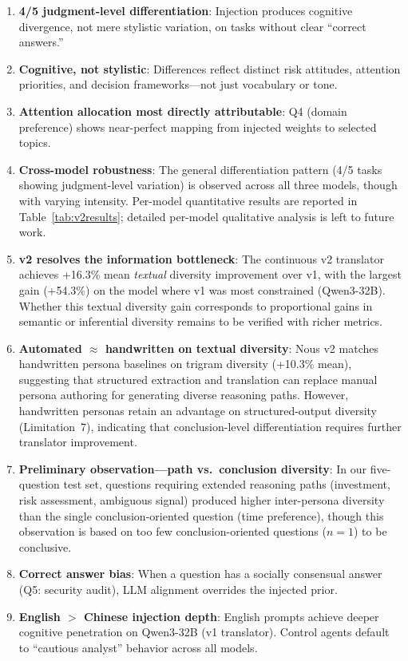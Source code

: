 \documentclass[11pt]{article}
\begin{document}
\begin{enumerate}[leftmargin=*,itemsep=2pt]
    \item \textbf{4/5 judgment-level differentiation}: Injection produces cognitive divergence, not mere stylistic variation, on tasks without clear ``correct answers.''
    \item \textbf{Cognitive, not stylistic}: Differences reflect distinct risk attitudes, attention priorities, and decision frameworks---not just vocabulary or tone.
    \item \textbf{Attention allocation most directly attributable}: Q4 (domain preference) shows near-perfect mapping from injected weights to selected topics.
    \item \textbf{Cross-model robustness}: The general differentiation pattern (4/5 tasks showing judgment-level variation) is observed across all three models, though with varying intensity. Per-model quantitative results are reported in Table~\ref{tab:v2results}; detailed per-model qualitative analysis is left to future work.
    \item \textbf{v2 resolves the information bottleneck}: The continuous v2 translator achieves +16.3\% mean \emph{textual} diversity improvement over v1, with the largest gain (+54.3\%) on the model where v1 was most constrained (Qwen3-32B). Whether this textual diversity gain corresponds to proportional gains in semantic or inferential diversity remains to be verified with richer metrics.
    \item \textbf{Automated $\approx$ handwritten on textual diversity}: Nous v2 matches handwritten persona baselines on trigram diversity (+10.3\% mean), suggesting that structured extraction and translation can replace manual persona authoring for generating diverse reasoning paths. However, handwritten personas retain an advantage on structured-output diversity (Limitation~7), indicating that conclusion-level differentiation requires further translator improvement.
    \item \textbf{Preliminary observation---path vs.\ conclusion diversity}: In our five-question test set, questions requiring extended reasoning paths (investment, risk assessment, ambiguous signal) produced higher inter-persona diversity than the single conclusion-oriented question (time preference), though this observation is based on too few conclusion-oriented questions ($n=1$) to be conclusive.
    \item \textbf{Correct answer bias}: When a question has a socially consensual answer (Q5: security audit), LLM alignment overrides the injected prior.
    \item \textbf{English $>$ Chinese injection depth}: English prompts achieve deeper cognitive penetration on Qwen3-32B (v1 translator). Control agents default to ``cautious analyst'' behavior across all models.
\end{enumerate}
\end{document}
